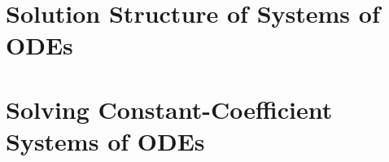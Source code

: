 
\section{Solution Structure of Systems of ODEs}


\section{Solving Constant-Coefficient Systems of ODEs}








